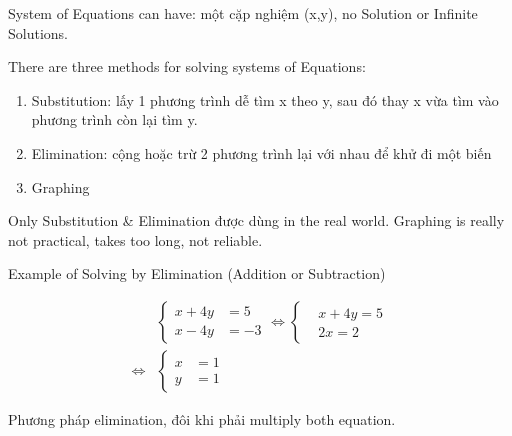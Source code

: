 System of Equations can have: một cặp nghiệm (x,y), no Solution or Infinite Solutions.

\vspace{.4cm}

There are three methods for solving systems of Equations:

\begin{enumerate}
  \item Substitution: lấy 1 phương trình dễ tìm x theo y, sau đó thay x vừa tìm vào phương trình còn lại tìm y.
  \item Elimination: cộng hoặc trừ 2 phương trình lại với nhau để khử đi một biến
  \item Graphing
\end{enumerate}

Only Substitution \& Elimination được dùng in the real world. Graphing is really not practical, takes too long, not reliable.


Example of Solving by Elimination (Addition or Subtraction)

\[
  \begin{aligned}
    &\left\{\begin{aligned} 
      x + 4y &= 5 \\ 
      x - 4y &= -3
    \end{aligned}\right. \iff 
    \left\{\begin{aligned}
      &x +4y = 5\\ 
      &2x = 2
    \end{aligned}\right.
    \\
    \iff &\left\{\begin{aligned} 
      x &= 1 \\ 
      y &= 1
    \end{aligned}\right.
  \end{aligned}
\]

\newpage

Phương pháp elimination, đôi khi phải multiply both equation.

